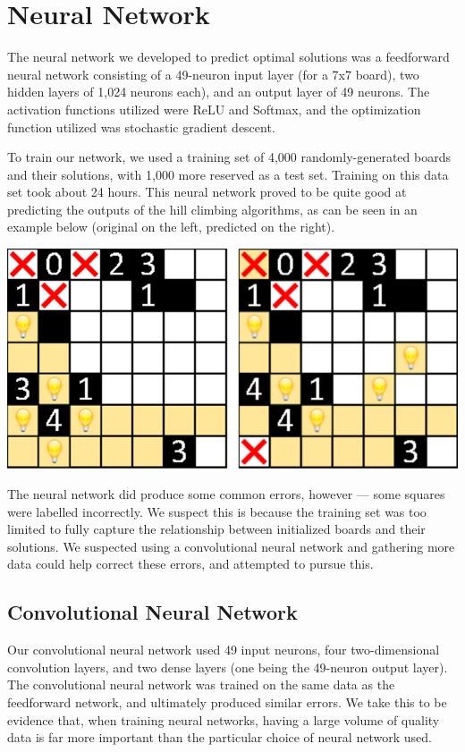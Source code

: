 \documentclass{article} %
\begin{document}
\section{Neural Network}

The neural network we developed to predict optimal solutions was a feedforward neural network consisting of a 49-neuron input layer (for a 7x7 board), two hidden layers of 1,024 neurons each), and an output layer of 49 neurons. The activation functions utilized were ReLU and Softmax, and the optimization function utilized was stochastic gradient descent.

To train our network, we used a training set of 4,000 randomly-generated boards and their solutions, with 1,000 more reserved as a test set. Training on this data set took about 24 hours. This neural network proved to be quite good at predicting the outputs of the hill climbing algorithms, as can be seen in an example below (original on the left, predicted on the right).

\includegraphics[width=\textwidth]{Prediction}

The neural network did produce some common errors, however — some squares were labelled incorrectly. We suspect this is because the training set was too limited to fully capture the relationship between initialized boards and their solutions. We suspected using a convolutional neural network and gathering more data could help correct these errors, and attempted to pursue this.

\subsection{Convolutional Neural Network}

Our convolutional neural network used 49 input neurons, four two-dimensional convolution layers, and two dense layers (one being the 49-neuron output layer). The convolutional neural network was trained on the same data as the feedforward network, and ultimately produced similar errors. We take this to be evidence that, when training neural networks, having a large volume of quality data is far more important than the particular choice of neural network used.
\end{document}

